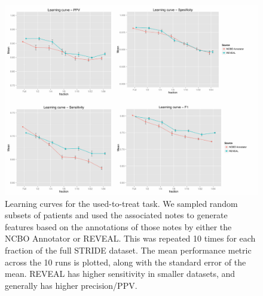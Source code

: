 \begin{figure}
  \begin{center}
    \includegraphics[width=0.9\linewidth]{ch4-figures/Figure6.pdf}
  \end{center}
  \caption[Learning used-to-treat relationships with limited
    data]{Learning curves for the used-to-treat task. We sampled
    random subsets of patients and used the associated notes to
    generate features based on the annotations of those notes by
    either the NCBO Annotator or REVEAL.  This was repeated 10 times
    for each fraction of the full STRIDE dataset.  The mean
    performance metric across the 10 runs is plotted, along with the
    standard error of the mean.  REVEAL has higher sensitivity in
    smaller datasets, and generally has higher precision/PPV.}
  \label{fig:short}
\end{figure}


